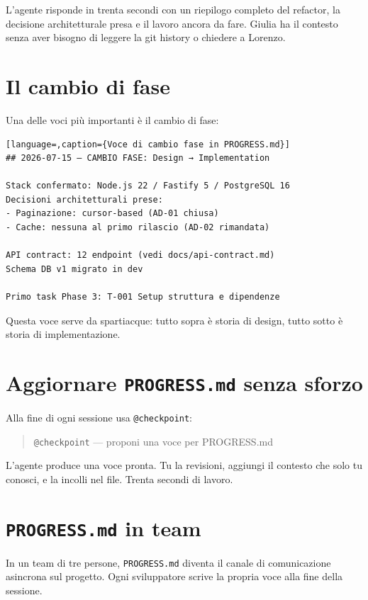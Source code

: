 L'agente risponde in trenta secondi con un riepilogo completo del refactor, la decisione architetturale presa e il lavoro ancora da fare. Giulia ha il contesto senza aver bisogno di leggere la git history o chiedere a Lorenzo.

\section{Il cambio di fase}
\label{sec:05-cambio-fase}

Una delle voci più importanti è il cambio di fase:

\begin{lstlisting}[language=,caption={Voce di cambio fase in PROGRESS.md}]
## 2026-07-15 — CAMBIO FASE: Design → Implementation

Stack confermato: Node.js 22 / Fastify 5 / PostgreSQL 16
Decisioni architetturali prese:
- Paginazione: cursor-based (AD-01 chiusa)
- Cache: nessuna al primo rilascio (AD-02 rimandata)

API contract: 12 endpoint (vedi docs/api-contract.md)
Schema DB v1 migrato in dev

Primo task Phase 3: T-001 Setup struttura e dipendenze
\end{lstlisting}

Questa voce serve da spartiacque: tutto sopra è storia di design, tutto sotto è storia di implementazione.

\section{Aggiornare \texttt{PROGRESS.md} senza sforzo}
\label{sec:05-aggiornamento}

Alla fine di ogni sessione usa \texttt{@checkpoint}:

\begin{quote}
\texttt{@checkpoint} --- proponi una voce per PROGRESS.md
\end{quote}

L'agente produce una voce pronta. Tu la revisioni, aggiungi il contesto che solo tu conosci, e la incolli nel file. Trenta secondi di lavoro.

\section{\texttt{PROGRESS.md} in team}
\label{sec:05-team}

In un team di tre persone, \texttt{PROGRESS.md} diventa il canale di comunicazione asincrona sul progetto. Ogni sviluppatore scrive la propria voce alla fine della sessione.

